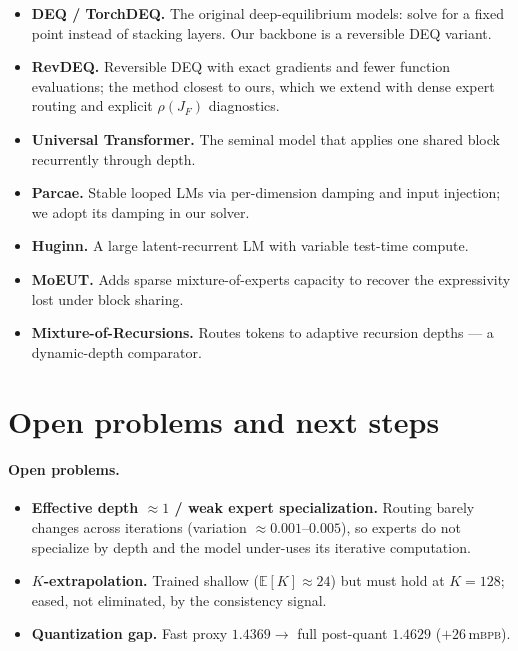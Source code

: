 \documentclass[11pt]{article}
\newcommand{\E}{\mathbb{E}}
\newcommand{\rhoF}{\rho(J_F)}
\newcommand{\bpb}{\textsc{bpb}}
\begin{document}
\begin{itemize}[leftmargin=1.2em, itemsep=2pt]
\item \textbf{DEQ / TorchDEQ.} The original deep-equilibrium models: solve for a fixed point instead of stacking layers. Our backbone is a reversible DEQ variant.
\item \textbf{RevDEQ.} Reversible DEQ with exact gradients and fewer function evaluations; the method closest to ours, which we extend with dense expert routing and explicit $\rhoF$ diagnostics.
\item \textbf{Universal Transformer.} The seminal model that applies one shared block recurrently through depth.
\item \textbf{Parcae.} Stable looped LMs via per-dimension damping and input injection; we adopt its damping in our solver.
\item \textbf{Huginn.} A large latent-recurrent LM with variable test-time compute.
\item \textbf{MoEUT.} Adds sparse mixture-of-experts capacity to recover the expressivity lost under block sharing.
\item \textbf{Mixture-of-Recursions.} Routes tokens to adaptive recursion depths --- a dynamic-depth comparator.
\end{itemize}

\section{Open problems and next steps}
\label{sec:next}

\paragraph{Open problems.}
\begin{itemize}[leftmargin=1.2em, itemsep=2pt]
\item \textbf{Effective depth $\approx 1$ / weak expert specialization.} Routing barely changes across iterations (variation $\approx 0.001$--$0.005$), so experts do not specialize by depth and the model under-uses its iterative computation.
\item \textbf{$K$-extrapolation.} Trained shallow ($\E[K]\!\approx\!24$) but must hold at $K{=}128$; eased, not eliminated, by the consistency signal.
\item \textbf{Quantization gap.} Fast proxy $1.4369 \to$ full post-quant $1.4629$ ($+26$\,m\bpb).
\end{itemize}
\end{document}
